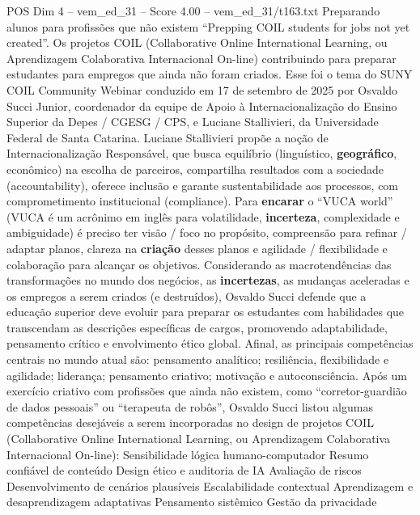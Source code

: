 \begin{textsample}{POS Dim 4 – vem\_ed\_31 – Score 4.00 – vem\_ed\_31/t163.txt}  \label{ex:f4_pos_143}
Preparando alunos para profissões que não existem “Prepping COIL students for jobs not yet created”.
Os projetos COIL (Collaborative Online International Learning, ou Aprendizagem Colaborativa Internacional On-line) contribuindo para preparar estudantes para empregos que ainda não foram criados.
Esse foi o tema do SUNY COIL Community Webinar conduzido em 17 de setembro de 2025 por Osvaldo Succi Junior, coordenador da equipe de Apoio à Internacionalização do Ensino Superior da Depes / CGESG / CPS, e Luciane Stallivieri, da Universidade Federal de Santa Catarina.
Luciane Stallivieri propõe a noção de Internacionalização Responsável, que busca equilíbrio (linguístico, \textbf{geográfico}, econômico) na escolha de parceiros, compartilha resultados com a sociedade (accountability), oferece inclusão e garante sustentabilidade aos processos, com comprometimento institucional (compliance).
Para \textbf{encarar} o “VUCA world” (VUCA é um acrônimo em inglês para volatilidade, \textbf{incerteza}, complexidade e ambiguidade) é preciso ter visão / foco no propósito, compreensão para refinar / adaptar planos, clareza na \textbf{criação} desses planos e agilidade / flexibilidade e colaboração para alcançar os objetivos.
Considerando as macrotendências das transformações no mundo dos negócios, as \textbf{incertezas}, as mudanças aceleradas e os empregos a serem criados (e destruídos), Osvaldo Succi defende que a educação superior deve evoluir para preparar os estudantes com habilidades que transcendam as descrições específicas de cargos, promovendo adaptabilidade, pensamento crítico e envolvimento ético global.
Afinal, as principais competências centrais no mundo atual são: pensamento analítico; resiliência, flexibilidade e agilidade; liderança; pensamento criativo; motivação e autoconsciência.
Após um exercício criativo com profissões que ainda não existem, como “corretor-guardião de dados pessoais” ou “terapeuta de robôs”, Osvaldo Succi listou algumas competências desejáveis a serem incorporadas no design de projetos COIL (Collaborative Online International Learning, ou Aprendizagem Colaborativa Internacional On-line): Sensibilidade lógica humano-computador Resumo confiável de conteúdo Design ético e auditoria de IA Avaliação de riscos Desenvolvimento de cenários plausíveis Escalabilidade contextual Aprendizagem e desaprendizagem adaptativas Pensamento sistêmico Gestão da privacidade

\end{textsample}
